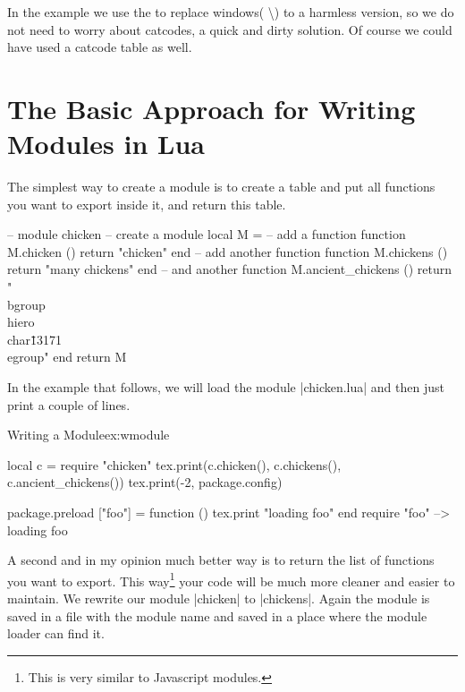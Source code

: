 In the example we use the  to replace windows( \textbackslash) to a harmless version, so we do not need to worry about catcodes, a quick and dirty solution.  Of course we could have used a catcode table as well.

\section{The Basic Approach for Writing Modules in Lua}

The simplest way to create a module is to create a table and put all functions you want to export inside it, and return this table.

\begin{lualisting}
-- module chicken
-- create a module
local M = {}
-- add a function
function M.chicken ()
  return "chicken"
end
-- add another function
function M.chickens ()
  return "many chickens" 
end
-- and another
function M.ancient_chickens ()
  return "\\bgroup\\hiero\\char\"13171 \\egroup"
end
return M
\end{lualisting}

In the example that follows, we will load the module |chicken.lua| and then just print a couple of lines.
\begin{luaexample}{Writing a Module}{ex:wmodule}
\begin{luacode*}
local c = require "chicken"
      tex.print(c.chicken(), c.chickens(), c.ancient_chickens())
      tex.print(-2, package.config)
      
      package.preload ["foo"] = function () tex.print "loading foo" end
require "foo"  --> loading foo
\end{luacode*}
\end{luaexample}



A second and in my opinion much better way is to return the list of functions you want to export. This way\footnote{This is very similar to Javascript modules.} your code will be much more cleaner and easier to maintain. We rewrite our module |chicken|  to |chickens|. Again the module is saved in a file with the module name and saved in a place where the module loader can find it. 

